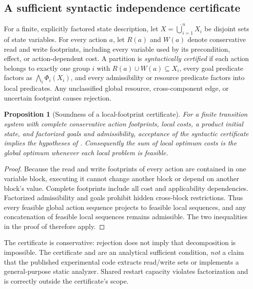 \documentclass[11pt,a4paper]{article}
\newtheorem{proposition}{Proposition}
\begin{document}
\subsection{A sufficient syntactic independence certificate}
For a finite, explicitly factored state description, let $X=\dot\bigcup_{i=1}^n X_i$ be disjoint sets of state variables. For every action $a$, let $R(a)$ and $W(a)$ denote conservative read and write footprints, including every variable used by its precondition, effect, or action-dependent cost. A partition is \emph{syntactically certified} if each action belongs to exactly one group $i$ with $R(a)\cup W(a)\subseteq X_i$, every goal predicate factors as $\bigwedge_i\Phi_i(X_i)$, and every admissibility or resource predicate factors into local predicates. Any unclassified global resource, cross-component edge, or uncertain footprint causes rejection.
\begin{proposition}[Soundness of a local-footprint certificate]\label{prop:footprint}
For a finite transition system with complete conservative action footprints, local costs, a product initial state, and factorized goals and admissibility, acceptance of the syntactic certificate implies the hypotheses of . Consequently the sum of local optimum costs is the global optimum whenever each local problem is feasible.
\end{proposition}
\begin{proof}
Because the read and write footprints of every action are contained in one variable block, executing it cannot change another block or depend on another block's value. Complete footprints include all cost and applicability dependencies. Factorized admissibility and goals prohibit hidden cross-block restrictions. Thus every feasible global action sequence projects to feasible local sequences, and any concatenation of feasible local sequences remains admissible. The two inequalities in the proof of  therefore apply.
\end{proof}
The certificate is conservative: rejection does not imply that decomposition is impossible. The certificate and  are an analytical sufficient condition, \emph{not} a claim that the published experimental code extracts read/write sets or implements a general-purpose static analyzer. Shared restart capacity violates factorization and is correctly outside the certificate's scope.
\end{document}
